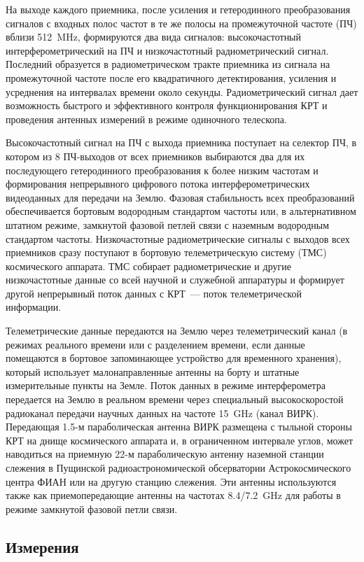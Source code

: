 На выходе каждого приемника, после усиления и гетеродинного преобразования сигналов с входных полос
частот в те же полосы на промежуточной частоте (ПЧ) вблизи \SI{512}{\MHz}, формируются два вида
сигналов: высокочастотный интерферометрический на ПЧ и низкочастотный радиометрический сигнал.
Последний образуется в радиометрическом тракте приемника из сигнала на промежуточной частоте после
его квадратичного детектирования, усиления и усреднения на интервалах времени около секунды.
Радиометрический сигнал дает возможность быстрого и эффективного контроля функционирования КРТ и
проведения антенных измерений в режиме одиночного телескопа.

Высокочастотный сигнал на ПЧ с выхода приемника поступает на селектор ПЧ, в котором из 8 ПЧ-выходов
от всех приемников выбираются два для их последующего гетеродинного преобразования к более низким
частотам и формирования непрерывного цифрового потока интерферометрических видеоданных для передачи
на Землю. Фазовая стабильность всех преобразований обеспечивается бортовым водородным стандартом
частоты или, в альтернативном штатном режиме, замкнутой фазовой петлей связи с наземным водородным
стандартом частоты. Низкочастотные радиометрические сигналы с выходов всех приемников сразу
поступают в бортовую телеметрическую систему (ТМС) космического аппарата. ТМС собирает
радиометрические и другие низкочастотные данные со всей научной и служебной аппаратуры и формирует
другой непрерывный поток данных с КРТ~--- поток телеметрической информации.

Телеметрические данные передаются на Землю через телеметрический канал (в режимах реального времени
или с разделением времени, если данные помещаются в бортовое запоминающее устройство для временного
хранения), который использует малонаправленные антенны на борту и штатные измерительные пункты на
Земле. Поток данных в режиме интерферометра передается на Землю в реальном времени через специальный
высокоскоростой радиоканал передачи научных данных на частоте \SI{15}{\GHz} (канал ВИРК). Передающая
1.5-м параболическая антенна ВИРК размещена с тыльной стороны КРТ на днище космического аппарата и,
в ограниченном интервале углов, может наводиться на приемную 22-м параболическую антенну наземной
станции слежения в Пущинской радиоастрономической обсерватории Астрокосмического центра ФИАН или на
другую станцию слежения. Эти антенны используются также как приемопередающие антенны на частотах
\num{8.4}/\SI{7.2}{\GHz} для работы в режиме замкнутой фазовой петли связи.


\subsection{Измерения}


